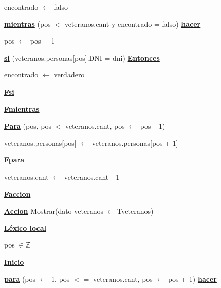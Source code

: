 \documentclass{article}
\begin{document}
            \hspace{12mm} encontrado $\leftarrow$ falso

            \hspace{12mm}\underline{\textbf{mientras}} (pos $<$ veteranos.cant y encontrado = falso) \underline{\textbf{hacer}}

                \hspace{16mm}pos $\leftarrow$ pos + 1

                \hspace{16mm}\underline{\textbf{si}} (veteranos.personas[pos].DNI = dni) \underline{\textbf{Entonces}}

                    \hspace{20mm}encontrado $\leftarrow$ verdadero

                \hspace{16mm}\underline{\textbf{Fsi}}

            \hspace{12mm}\underline{\textbf{Fmientras}}

            \hspace{12mm}\underline{\textbf{Para}} (pos, pos $<$ veteranos.cant, pos $\leftarrow$ pos +1)

                \hspace{16mm}veteranos.personas[pos] $\leftarrow$ veteranos.personas[pos + 1]

            \hspace{12mm}\underline{\textbf{Fpara}}

            \hspace{12mm}veteranos.cant $\leftarrow$ veteranos.cant - 1

    \hspace{4mm}\underline{\textbf{Faccion}}

    \vspace{4mm}

    \hspace{4mm}\underline{\textbf{Accion}} Mostrar(dato veteranos $\in$ Tveteranos)

        \hspace{8mm}\underline{\textbf{Léxico local}}

            \hspace{12mm}pos $\in \mathbb{Z}$

        \hspace{8mm}\underline{\textbf{Inicio}}

            \hspace{12mm}\underline{\textbf{para}} (pos $\leftarrow$ 1, pos $<=$ veteranos.cant, pos $\leftarrow$ pos + 1)
            \underline{\textbf{hacer}}
\end{document}
